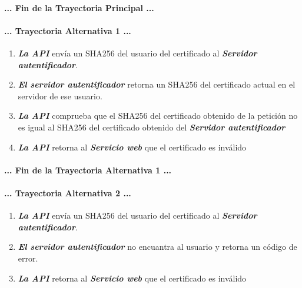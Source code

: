 \documentclass[12pt, a4paper, titlepage]{report}
\begin{document}
    		\paragraph{... Fin de la Trayectoria Principal ...}
    			
    		\paragraph{... Trayectoria Alternativa 1 ...}
    			\begin{enumerate}
    				\item \textbf{\textit{La API}} envía un SHA256 del usuario del certificado al \textbf{\textit{Servidor autentificador}}.
    				
    				\item \textbf{\textit{El servidor autentificador}} retorna un SHA256 del certificado actual en el servidor de ese usuario.
    				
    				\item \textbf{\textit{La API}} comprueba que el SHA256 del certificado obtenido de la petición no es igual al SHA256 del certificado obtenido del \textbf{\textit{Servidor autentificador}}
    				
    				\item \textbf{\textit{La API}} retorna al \textbf{\textit{Servicio web}} que el certificado es inválido
    			\end{enumerate}
    		\paragraph{... Fin de la Trayectoria Alternativa 1 ...}
    		
    		\paragraph{... Trayectoria Alternativa 2 ...}
    			\begin{enumerate}
    				\item \textbf{\textit{La API}} envía un SHA256 del usuario del certificado al \textbf{\textit{Servidor autentificador}}.
    				
    				\item \textbf{\textit{El servidor autentificador}} no encuantra al usuario y retorna un código de error.
    				
    				\item \textbf{\textit{La API}} retorna al \textbf{\textit{Servicio web}} que el certificado es inválido
    			\end{enumerate}
\end{document}
